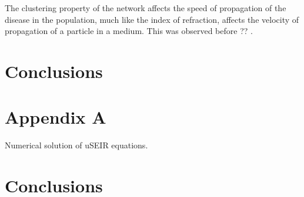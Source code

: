 \documentclass[a4paper,oneside,11pt]{article}
\begin{document}
The clustering property of the network affects the speed of propagation of the disease in the population, much like the index of refraction, affects the velocity of propagation of a particle in a medium. This was observed before ?? \cite{}.



\section{Conclusions}

\section*{Appendix A}

Numerical solution of uSEIR equations.








\section{Conclusions}
\end{document}
